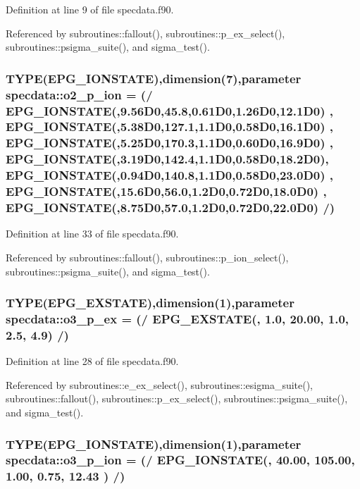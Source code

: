 Definition at line 9 of file specdata.f90.

Referenced by subroutines::fallout(), subroutines::p\_\-ex\_\-select(), subroutines::psigma\_\-suite(), and sigma\_\-test().\hypertarget{namespacespecdata_a1de88d1ad1d0aa421deaf2c5ac887ed8}{
\subsubsection[{o2\_\-p\_\-ion}]{\setlength{\rightskip}{0pt plus 5cm}TYPE(EPG\_\-IONSTATE),dimension(7),parameter {\bf specdata::o2\_\-p\_\-ion} = (/ EPG\_\-IONSTATE(,9.56D0,45.8,0.61D0,1.26D0,12.1D0) , EPG\_\-IONSTATE(,5.38D0,127.1,1.1D0,0.58D0,16.1D0) , EPG\_\-IONSTATE(,5.25D0,170.3,1.1D0,0.60D0,16.9D0) , EPG\_\-IONSTATE(,3.19D0,142.4,1.1D0,0.58D0,18.2D0), EPG\_\-IONSTATE(,0.94D0,140.8,1.1D0,0.58D0,23.0D0) , EPG\_\-IONSTATE(,15.6D0,56.0,1.2D0,0.72D0,18.0D0) , EPG\_\-IONSTATE(,8.75D0,57.0,1.2D0,0.72D0,22.0D0) /)}}
\label{namespacespecdata_a1de88d1ad1d0aa421deaf2c5ac887ed8}


Definition at line 33 of file specdata.f90.

Referenced by subroutines::fallout(), subroutines::p\_\-ion\_\-select(), subroutines::psigma\_\-suite(), and sigma\_\-test().\hypertarget{namespacespecdata_a5715afaf9a7cd31ff6c899aec265dc7e}{
\subsubsection[{o3\_\-p\_\-ex}]{\setlength{\rightskip}{0pt plus 5cm}TYPE(EPG\_\-EXSTATE),dimension(1),parameter {\bf specdata::o3\_\-p\_\-ex} = (/ EPG\_\-EXSTATE(, 1.0, 20.00, 1.0, 2.5, 4.9) /)}}
\label{namespacespecdata_a5715afaf9a7cd31ff6c899aec265dc7e}


Definition at line 28 of file specdata.f90.

Referenced by subroutines::e\_\-ex\_\-select(), subroutines::esigma\_\-suite(), subroutines::fallout(), subroutines::p\_\-ex\_\-select(), subroutines::psigma\_\-suite(), and sigma\_\-test().\hypertarget{namespacespecdata_a42d18c80256a5ca2ccebe8a3f4d451a0}{
\subsubsection[{o3\_\-p\_\-ion}]{\setlength{\rightskip}{0pt plus 5cm}TYPE(EPG\_\-IONSTATE),dimension(1),parameter {\bf specdata::o3\_\-p\_\-ion} = (/ EPG\_\-IONSTATE(, 40.00, 105.00, 1.00, 0.75, 12.43 ) /)}}
\label{namespacespecdata_a42d18c80256a5ca2ccebe8a3f4d451a0}



